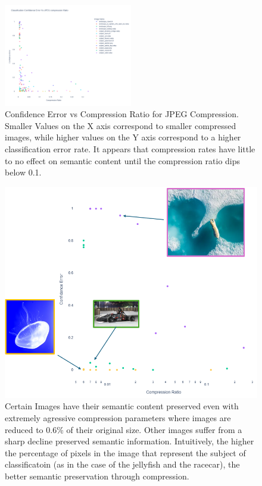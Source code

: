 \begin{figure}
    \label{fig:Comp vs Ratio JPEG Baseline}
    \includegraphics[width=0.5\textwidth]{assets/Baseline JPEG Confidence vs Comp Ratio.png}
    \caption{Confidence Error vs Compression Ratio for JPEG Compression. Smaller Values on the X axis correspond to smaller compressed images, while higher values on the Y axis correspond to a higher classification error rate. It appears that compression rates have little to no effect on semantic content until the compression ratio dips below 0.1.}
\end{figure}

\begin{figure}
    \label{fig:Annotated JPEG Baseline}
    \includegraphics[width=\textwidth*0.5]{assets/JPEG Baseline Compression with Examples}
    \caption{Certain Images have their semantic content preserved even with extremely agressive compression parameters where images are reduced to 0.6\% of their original size. Other images suffer from a sharp decline preserved semantic information. Intuitively, the higher the percentage of pixels in the image that represent the subject of classificatoin (as in the case of the jellyfish and the racecar), the better semantic preservation through compression.}
\end{figure}

